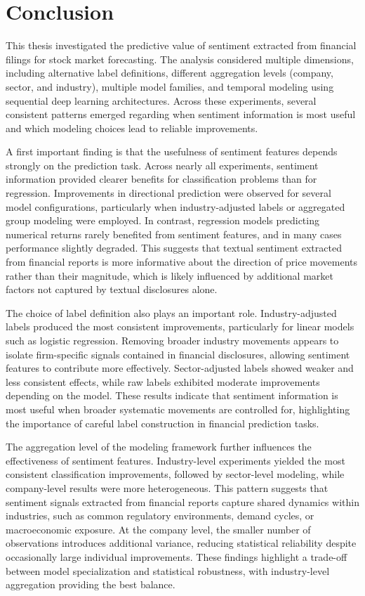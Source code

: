 \chapter{Conclusion}

This thesis investigated the predictive value of sentiment extracted from financial filings for stock market forecasting. The analysis considered multiple dimensions, including alternative label definitions, different aggregation levels (company, sector, and industry), multiple model families, and temporal modeling using sequential deep learning architectures. Across these experiments, several consistent patterns emerged regarding when sentiment information is most useful and which modeling choices lead to reliable improvements.

A first important finding is that the usefulness of sentiment features depends strongly on the prediction task. Across nearly all experiments, sentiment information provided clearer benefits for classification problems than for regression. Improvements in directional prediction were observed for several model configurations, particularly when industry-adjusted labels or aggregated group modeling were employed. In contrast, regression models predicting numerical returns rarely benefited from sentiment features, and in many cases performance slightly degraded. This suggests that textual sentiment extracted from financial reports is more informative about the direction of price movements rather than their magnitude, which is likely influenced by additional market factors not captured by textual disclosures alone.

The choice of label definition also plays an important role. Industry-adjusted labels produced the most consistent improvements, particularly for linear models such as logistic regression. Removing broader industry movements appears to isolate firm-specific signals contained in financial disclosures, allowing sentiment features to contribute more effectively. Sector-adjusted labels showed weaker and less consistent effects, while raw labels exhibited moderate improvements depending on the model. These results indicate that sentiment information is most useful when broader systematic movements are controlled for, highlighting the importance of careful label construction in financial prediction tasks.

The aggregation level of the modeling framework further influences the effectiveness of sentiment features. Industry-level experiments yielded the most consistent classification improvements, followed by sector-level modeling, while company-level results were more heterogeneous. This pattern suggests that sentiment signals extracted from financial reports capture shared dynamics within industries, such as common regulatory environments, demand cycles, or macroeconomic exposure. At the company level, the smaller number of observations introduces additional variance, reducing statistical reliability despite occasionally large individual improvements. These findings highlight a trade-off between model specialization and statistical robustness, with industry-level aggregation providing the best balance.

